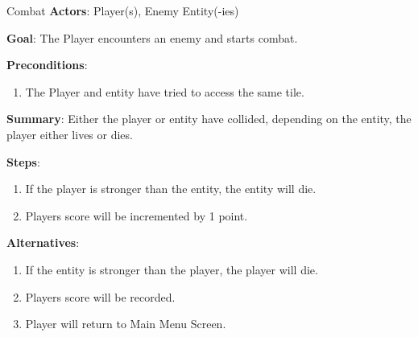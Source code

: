 \documentclass[12pt]{report}
\begin{document}


\begin{subsection}{Combat}
\textbf{Actors}:
Player(s), Enemy Entity(-ies)

\textbf{Goal}:
The Player encounters an enemy and starts combat.

\textbf{Preconditions}:
\begin{enumerate}
\item The Player and entity have tried to access the same tile.
\end{enumerate}

\textbf{Summary}:
Either the player or entity have collided, depending on the entity, the player either lives or dies.

\textbf{Steps}:
\begin{enumerate}
\item If the player is stronger than the entity, the entity will die.
\item Players score will be incremented by 1 point.
\end{enumerate}

\textbf{Alternatives}:
\begin{enumerate}
\item If the entity is stronger than the player, the player will die.
\item Players score will be recorded.
\item Player will return to Main Menu Screen.
\end{enumerate}
\end{subsection}
\end{document}
